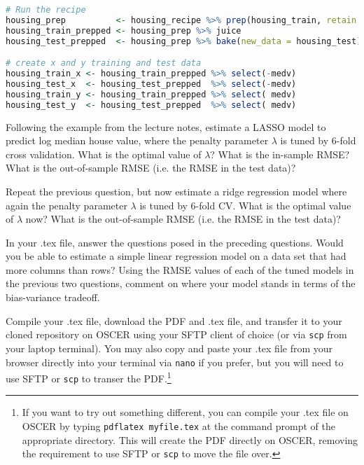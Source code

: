 \documentclass[12pt,english]{exam}
\begin{document}
\begin{questions}
\begin{lstlisting}[language=R]
# Run the recipe
housing_prep          <- housing_recipe %>% prep(housing_train, retain = TRUE)
housing_train_prepped <- housing_prep %>% juice
housing_test_prepped  <- housing_prep %>% bake(new_data = housing_test)

# create x and y training and test data
housing_train_x <- housing_train_prepped %>% select(-medv)
housing_test_x  <- housing_test_prepped  %>% select(-medv)
housing_train_y <- housing_train_prepped %>% select( medv)
housing_test_y  <- housing_test_prepped  %>% select( medv)
\end{lstlisting}

\question Following the example from the lecture notes, estimate a LASSO model to predict log median house value, where the penalty parameter $\lambda$ is tuned by 6-fold cross validation. What is the optimal value of $\lambda$? What is the in-sample RMSE? What is the out-of-sample RMSE (i.e. the RMSE in the test data)?

\question Repeat the previous question, but now estimate a ridge regression model where again the penalty parameter $\lambda$ is tuned by 6-fold CV. What is the optimal value of $\lambda$ now? What is the out-of-sample RMSE (i.e. the RMSE in the test data)? 


\question In your .tex file, answer the questions posed in the preceding questions. Would you be able to estimate a simple linear regression model on a data set that had more columns than rows? Using the RMSE values of each of the tuned models in the previous two questions, comment on where your model stands in terms of the bias-variance tradeoff.

\question Compile your .tex file, download the PDF and .tex file, and transfer it to your cloned repository on OSCER using your SFTP client of choice (or via \texttt{scp} from your laptop terminal). You may also copy and paste your .tex file from your browser directly into your terminal via \texttt{nano} if you prefer, but you will need to use SFTP or \texttt{scp} to transer the PDF.\footnote{If you want to try out something different, you can compile your .tex file on OSCER by typing \texttt{pdflatex myfile.tex} at the command prompt of the appropriate directory. This will create the PDF directly on OSCER, removing the requirement to use SFTP or \texttt{scp} to move the file over.}


\end{questions}
\end{document}
